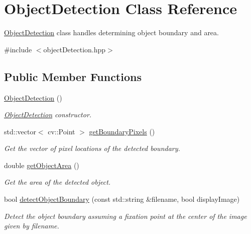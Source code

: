 \hypertarget{classObjectDetection}{\section{Object\-Detection Class Reference}
\label{classObjectDetection}
}


\hyperlink{classObjectDetection}{Object\-Detection} class handles determining object boundary and area.  




{\ttfamily \#include $<$object\-Detection.\-hpp$>$}

\subsection*{Public Member Functions}
\begin{DoxyCompactItemize}
\item 
\hyperlink{classObjectDetection_a6ccb25952ecc45811451c5cb623e23ee}{Object\-Detection} ()
\begin{DoxyCompactList}\small\item\em \hyperlink{classObjectDetection}{Object\-Detection} constructor. \end{DoxyCompactList}\item 
std\-::vector$<$ cv\-::\-Point $>$ \hyperlink{classObjectDetection_acc15129e94b7dcb535a56508f421540b}{get\-Boundary\-Pixels} ()
\begin{DoxyCompactList}\small\item\em Get the vector of pixel locations of the detected boundary. \end{DoxyCompactList}\item 
double \hyperlink{classObjectDetection_a6fd1c62e8a95d0eab4dee4787952519d}{get\-Object\-Area} ()
\begin{DoxyCompactList}\small\item\em Get the area of the detected object. \end{DoxyCompactList}\item 
bool \hyperlink{classObjectDetection_a172f8a9b04616ae0c5ac962fc1bfec66}{detect\-Object\-Boundary} (const std\-::string \&filename, bool display\-Image)
\begin{DoxyCompactList}\small\item\em Detect the object boundary assuming a fixation point at the center of the image given by filename. \end{DoxyCompactList}\end{DoxyCompactItemize}



